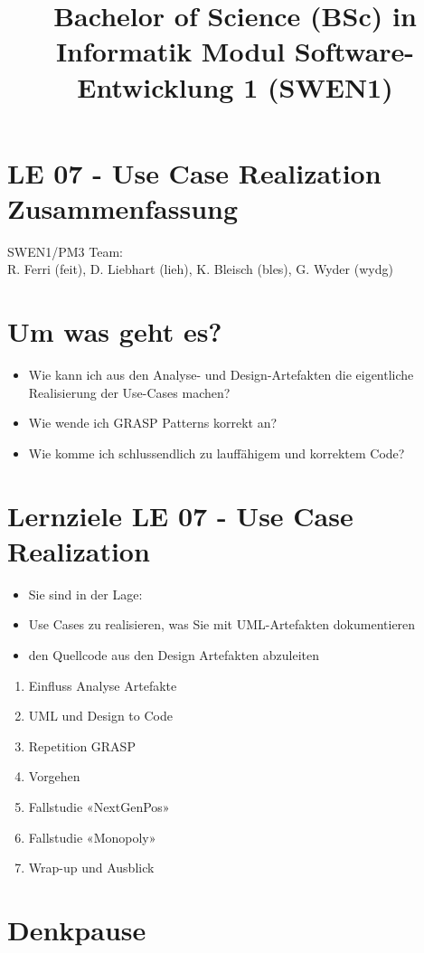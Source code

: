 \documentclass[10pt]{article}
\title{Bachelor of Science (BSc) in Informatik Modul Software-Entwicklung 1 (SWEN1) }
\author{}
\date{}
\begin{document}
\maketitle
\section*{LE 07 - Use Case Realization Zusammenfassung}
SWEN1/PM3 Team:\\
R. Ferri (feit), D. Liebhart (lieh), K. Bleisch (bles), G. Wyder (wydg)

\section*{Um was geht es?}
\begin{itemize}
  \item Wie kann ich aus den Analyse- und Design-Artefakten die eigentliche Realisierung der Use-Cases machen?
  \item Wie wende ich GRASP Patterns korrekt an?
  \item Wie komme ich schlussendlich zu lauffähigem und korrektem Code?
\end{itemize}

\section*{Lernziele LE 07 - Use Case Realization}
\begin{itemize}
  \item Sie sind in der Lage:
  \item Use Cases zu realisieren, was Sie mit UML-Artefakten dokumentieren
  \item den Quellcode aus den Design Artefakten abzuleiten
\end{itemize}

\begin{enumerate}
  \item Einfluss Analyse Artefakte
  \item UML und Design to Code
  \item Repetition GRASP
  \item Vorgehen
  \item Fallstudie «NextGenPos»
  \item Fallstudie «Monopoly»
  \item Wrap-up und Ausblick
\end{enumerate}

\section*{Denkpause}
\end{document}
